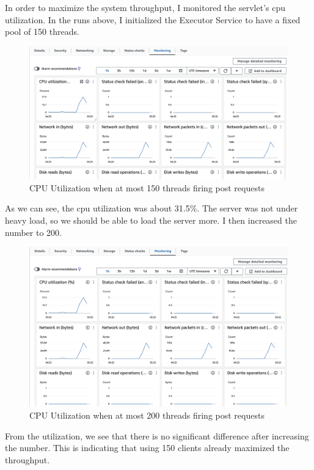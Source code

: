 \documentclass[a4paper,12pt]{article} %
\begin{document}
\begin{enumerate}
\newpage
In order to maximize the system throughput, I monitored the servlet's cpu utilization. In the runs above, I initialized the Executor Service to have a fixed pool of 150 threads. 
\begin{figure}[H]
    \centering
    \includegraphics[width=\textwidth]{images/cpu_util.png}
    \caption{CPU Utilization when at most 150 threads firing post requests}
\end{figure}
As we can see, the cpu utilization was about 31.5\%. The server was not under heavy load, so we should be able to load the server more. I then increased the number to 200.
\begin{figure}[H]
    \centering
    \includegraphics[width=\textwidth]{images/cpu_util_200client.png}
    \caption{CPU Utilization when at most 200 threads firing post requests}
\end{figure}
From the utilization, we see that there is no significant difference after increasing the number. This is indicating that using 150 clients already maximized the throughput. 


\end{enumerate}
\end{document}
